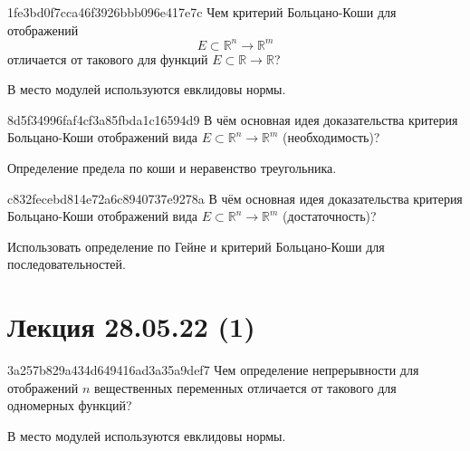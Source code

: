 \begin{note}{1fe3bd0f7cca46f3926bbb096e417e7c}
    Чем критерий Больцано-Коши для отображений
    \[
        E \subset \mathbb R^{n} \to \mathbb R^{m}
    \]
    отличается от такового для функций \({ E \subset \mathbb R \to \mathbb R }\)?

    \begin{cloze}{1}
        В место модулей используются евклидовы нормы.
    \end{cloze}
\end{note}

\begin{note}{8d5f34996faf4cf3a85fbda1c16594d9}
    В чём основная идея доказательства критерия Больцано-Коши отображений вида \({ E \subset \mathbb R^{n} \to \mathbb R^{m} }\) (необходимость)?

    \begin{cloze}{1}
        Определение предела по коши и неравенство треугольника.
    \end{cloze}
\end{note}

\begin{note}{c832fecebd814e72a6c8940737e9278a}
    В чём основная идея доказательства критерия Больцано-Коши отображений вида \({ E \subset \mathbb R^{n} \to \mathbb R^{m} }\) (достаточность)?

    \begin{cloze}{1}
        Использовать определение по Гейне и критерий Больцано-Коши для последовательностей.
    \end{cloze}
\end{note}

\section{Лекция 28.05.22 (1)}
\begin{note}{3a257b829a434d649416ad3a35a9def7}
    Чем определение непрерывности для отображений \({ n }\) вещественных переменных отличается от такового для одномерных функций?

    \begin{cloze}{1}
        В место модулей используются евклидовы нормы.
    \end{cloze}
\end{note}

